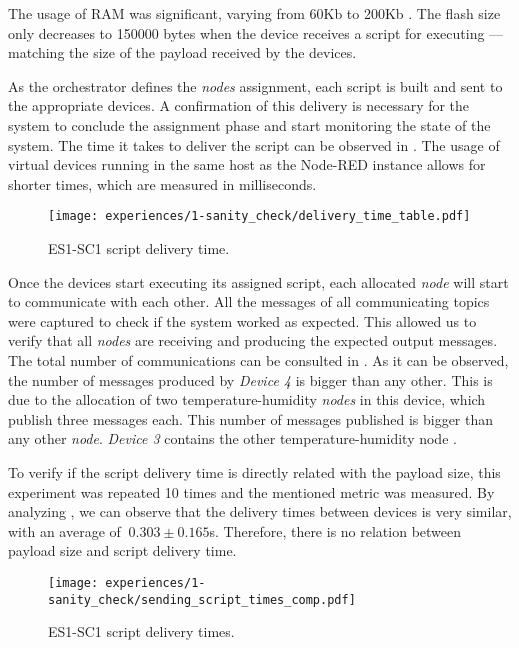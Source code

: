 The usage of RAM was significant, varying from 60Kb to 200Kb . The flash size only decreases to 150000 bytes when the device receives a script for executing --- matching the size of the payload received by the devices.

As the orchestrator defines the \textit{nodes} assignment, each script is built and sent to the appropriate devices. A confirmation of this delivery is necessary for the system to conclude the assignment phase and start monitoring the state of the system. The time it takes to deliver the script can be observed in . The usage of virtual devices running in the same host as the Node-RED instance allows for shorter times, which are measured in milliseconds.

\begin{figure}[H]
\centering
\texttt{[image: experiences/1-sanity\_check/delivery\_time\_table.pdf]}
\caption[ES1-SC1 script delivery time.]{ES1-SC1 script delivery time.}\label{fig:sanity_check_delivery_time}
\end{figure}

Once the devices start executing its assigned script, each allocated \textit{node} will start to communicate with each other. All the messages of all communicating topics were captured to check if the system worked as expected. This allowed us to verify that all \textit{nodes} are receiving and producing the expected output messages. The total number of communications can be consulted in . As it can be observed, the number of messages produced by \textit{Device 4} is bigger than any other. This is due to the allocation of two temperature-humidity \textit{nodes} in this device, which publish three messages each. This number of messages published is bigger than any other \textit{node}. \textit{Device 3} contains the other temperature-humidity node .

To verify if the script delivery time is directly related with the payload size, this experiment was repeated 10 times and the mentioned metric was measured. By analyzing , we can observe that the delivery times between devices is very similar, with an average of $~0.303\pm0.165$s. Therefore, there is no relation between payload size and script delivery time.

\begin{figure}[h]
\centering
\texttt{[image: experiences/1-sanity\_check/sending\_script\_times\_comp.pdf]}
\caption[ES1-SC1 delivery times.]{ES1-SC1 script delivery times.}\label{fig:delivery_times_comp}
\end{figure}

